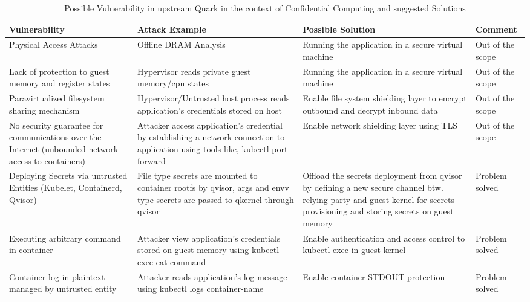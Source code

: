 \begin{table}[h]
    \tiny
    \caption{Possible Vulnerability in upstream Quark in the context of Confidential Computing and suggested Solutions}
    \label{crouch}
    \begin{tabular}{  p{3.4cm}  p{3.4cm}  p{3.4cm} p{2cm} }
        \toprule
\textbf{Vulnerability}      
& \textbf{Attack Example}   
& \textbf{Possible Solution}
& \textbf{Comment}  \\\midrule
Physical Access Attacks
& Offline DRAM Analysis          
& Running the application in a secure virtual machine
& Out of the scope   \\\hline
Lack of protection to guest memory and register states          
& Hypervisor reads private guest memory/cpu states                          
& Running the application in a secure virtual machine
& Out of the scope   \\\hline
Paravirtualized filesystem sharing mechanism       
& Hypervisor/Untrusted host process reads application’s credentials stored on host
& Enable file system shielding layer to encrypt outbound and decrypt inbound data 
& Out of the scope   \\\hline

No security guarantee for communications over the Internet (unbounded network access to containers)     
& Attacker access application’s credential by establishing a network connection to application using tools like, kubectl port-forward
& Enable network shielding layer using TLS
& Out of the scope   \\\hline

Deploying Secrets via untrusted Entities (Kubelet, Containerd, Qvisor)    
& File type secrets are mounted to container rootfs by qvisor, args and envv type secrets are passed to qkernel through qvisor
& Offload the secrets deployment from qvisor by defining a new secure channel btw. relying party and guest kernel for secrets provisioning and storing secrets on guest memory
& Problem solved  \\\hline

Executing arbitrary command in container  
& Attacker view application’s credentials stored on guest memory using kubectl exec cat command
& Enable authentication and access control to kubectl exec in guest kernel
& Problem solved  \\\hline


Container log in plaintext managed by untrusted entity
& Attacker reads application’s log message using kubectl logs container-name
& Enable container STDOUT protection
& Problem solved  \\\hline


\end{tabular}
\end{table}
